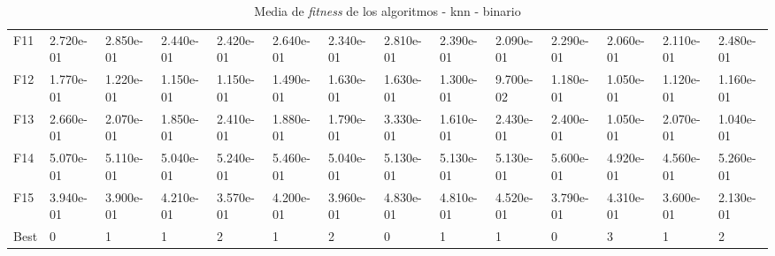 \begin{table}
\begin{adjustbox}{width=\linewidth}
\begin{tabular}{llllllllllllll}
            F11  & 2.720e-01 & 2.850e-01 & 2.440e-01 & 2.420e-01 & 2.640e-01 & 2.340e-01 & 2.810e-01 & 2.390e-01 & 2.090e-01 & 2.290e-01 & 2.060e-01 & 2.110e-01 & 2.480e-01 \\
            F12  & 1.770e-01 & 1.220e-01 & 1.150e-01 & 1.150e-01 & 1.490e-01 & 1.630e-01 & 1.630e-01 & 1.300e-01 & 9.700e-02 & 1.180e-01 & 1.050e-01 & 1.120e-01 & 1.160e-01 \\
            F13  & 2.660e-01 & 2.070e-01 & 1.850e-01 & 2.410e-01 & 1.880e-01 & 1.790e-01 & 3.330e-01 & 1.610e-01 & 2.430e-01 & 2.400e-01 & 1.050e-01 & 2.070e-01 & 1.040e-01 \\
            F14  & 5.070e-01 & 5.110e-01 & 5.040e-01 & 5.240e-01 & 5.460e-01 & 5.040e-01 & 5.130e-01 & 5.130e-01 & 5.130e-01 & 5.600e-01 & 4.920e-01 & 4.560e-01 & 5.260e-01 \\
            F15  & 3.940e-01 & 3.900e-01 & 4.210e-01 & 3.570e-01 & 4.200e-01 & 3.960e-01 & 4.830e-01 & 4.810e-01 & 4.520e-01 & 3.790e-01 & 4.310e-01 & 3.600e-01 & 2.130e-01 \\
            Best & 0         & 1         & 1         & 2         & 1         & 2         & 0         & 1         & 1         & 0         & 3         & 1         & 2         \\
            \bottomrule
        \end{tabular}
    \end{adjustbox}
    \caption{Media de \textit{fitness} de los algoritmos - knn - binario}
    \label{tab:mean_fitness_bin_knn}
\end{table}

